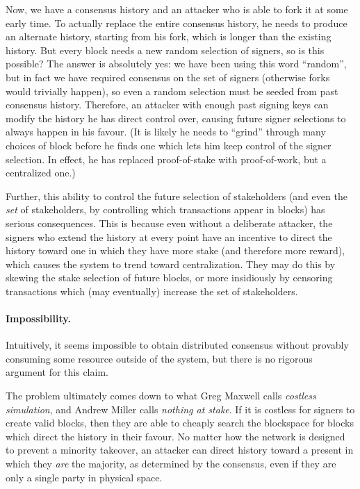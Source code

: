 \documentclass[letterpaper]{article}
\begin{document}
Now, we have a consensus history and an attacker who is able to fork it at some
early time. To actually replace the entire consensus history, he needs to produce
an alternate history, starting from his fork, which is longer than the existing
history. But every block needs a new random selection of signers, so is this
possible? The answer is absolutely yes: we have been using this word ``random'',
but in fact we have required consensus on the set of signers (otherwise forks
would trivially happen), so even a random selection must be seeded from past consensus
history. Therefore, an attacker with enough past signing keys can modify the
history he has direct control over, causing future signer selections to always
happen in his favour. (It is likely he needs to ``grind'' through many choices
of block before he finds one which lets him keep control of the signer selection.
In effect, he has replaced proof-of-stake with proof-of-work, but a centralized
one.)

Further, this ability to control the future selection of stakeholders (and even
the \emph{set} of stakeholders, by controlling which transactions appear in blocks)
has serious consequences. This is because even without a deliberate attacker, the
signers who extend the history at every point have an incentive to direct the history
toward one in which they have more stake (and therefore more reward), which causes
the system to trend toward centralization. They may do this by skewing the stake
selection of future blocks, or more insidiously by censoring transactions which
(may eventually) increase the set of stakeholders.

\paragraph{Impossibility.}
Intuitively, it seems impossible to obtain distributed consensus without provably
consuming some resource outside of the system, but there is no rigorous argument
for this claim.

The problem ultimately comes down to what Greg Maxwell calls \emph{costless
simulation}, and Andrew Miller calls \emph{nothing at stake}. If it is costless
for signers to create valid blocks, then they are able to cheaply search the
blockspace for blocks which direct the history in their favour. No matter how
the network is designed to prevent a minority takeover, an attacker can direct
history toward a present in which they \emph{are} the majority, as determined
by the consensus, even if they are only a single party in physical space.
\end{document}
